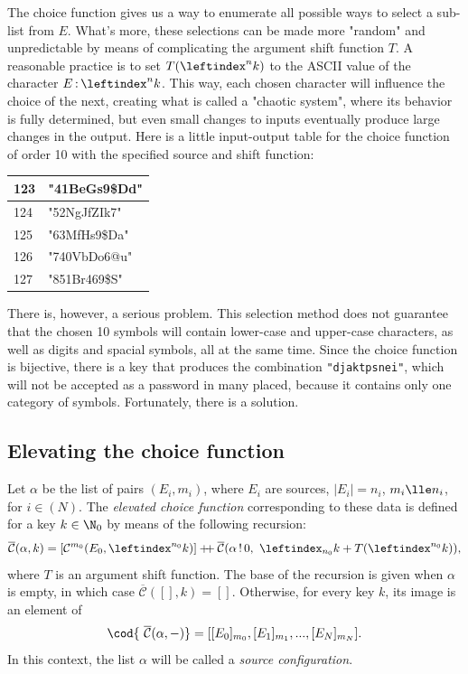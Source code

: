 \documentclass[12pt, a4paper]{article}
\renewcommand{\C}{\mathcal{C}}
\newcommand{\CC}{\overline{\mathcal{C}}}
\newcommand{\dop}{\mathbin{{+}\hspace{-1mm}{+}}}
\newcommand{\lli}[1]{\leftindex_{#1}}
\newcommand{\lui}[1]{\leftindex^{#1}}
\newcommand{\elt}{\mathop{:}}
\newcommand{\wo}{\mathop{!}}
\begin{document}
The choice function gives us a way to enumerate all possible ways to select a sub-list from $ E $. What's more, these selections can be made more "random" and unpredictable by means of complicating the argument shift function $ T $. A reasonable practice is to set $ T(\lui{n}k) $ to the ASCII value of the character $ E \elt \lui{n}k $. This way, each chosen character will influence the choice of the next, creating what is called a "chaotic system", where its behavior is fully determined, but even small changes to inputs eventually produce large changes in the output. Here is a little input-output table for the choice function of order 10 with the specified source and shift function:

\begin{center}
\def\arraystretch{1.3}
\begin{tabular}{l|l}
    123 & \ttfamily"41BeGs9\$Dd"\\
    \hline
    124 & \ttfamily"52NgJfZIk7"\\
    \hline
    125 & \ttfamily"63MfHs9\$Da"\\
    \hline
    126 & \ttfamily"740VbDo6@u"\\
    \hline
    127 & \ttfamily"851Br469\$S"\\
\end{tabular}
\end{center}

There is, however, a serious problem. This selection method does not guarantee that the chosen 10 symbols will contain lower-case and upper-case characters, as well as digits and spacial symbols, all at the same time. Since the choice function is bijective, there is a key that produces the combination \texttt{"djaktpsnei"}, which will not be accepted as a password in many placed, because it contains only one category of symbols. Fortunately, there is a solution.

\subsection{Elevating the choice function}

\begin{definition}
    Let $ \alpha $ be the list of pairs $ (E_i, m_i) $, where $ E_i $ are sources, $ |E_i| = n_i $, $ m_i \lle n_i $, for $ i \in (N) $. The \emph{elevated choice function} corresponding to these data is defined for a key $ k \in \N_0 $ by means of the following recursion:
    \[ \CC(\alpha, k) = [\C^{m_0}(E_0, \lui{n_0}k)] \dop \CC(\alpha \wo 0,\ \lli{n_0}k + T(\lui{n_0}k)), \]
    where $ T $ is an argument shift function. The base of the recursion is given when $ \alpha $ is empty, in which case $ \CC([], k) = [] $. Otherwise, for every key $ k $, its image is an element of
    \[ \cod{\ \CC(\alpha, -)} = [[E_0]_{m_0}, [E_1]_{m_1}, ..., [E_N]_{m_N}]. \]
    In this context, the list $ \alpha $ will be called a \emph{source configuration}.
\end{definition}
\end{document}
